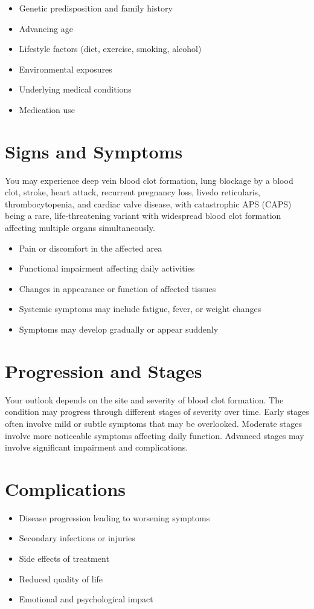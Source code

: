 \begin{itemize}[noitemsep]
  \item Genetic predisposition and family history
  \item Advancing age
  \item Lifestyle factors (diet, exercise, smoking, alcohol)
  \item Environmental exposures
  \item Underlying medical conditions
  \item Medication use
\end{itemize}
\section{Signs and Symptoms}
You may experience deep vein blood clot formation, lung blockage by a blood clot, stroke, heart attack, recurrent pregnancy loss, livedo reticularis, thrombocytopenia, and cardiac valve disease, with catastrophic APS (CAPS) being a rare, life-threatening variant with widespread blood clot formation affecting multiple organs simultaneously.

\begin{itemize}[noitemsep]
  \item Pain or discomfort in the affected area
  \item Functional impairment affecting daily activities
  \item Changes in appearance or function of affected tissues
  \item Systemic symptoms may include fatigue, fever, or weight changes
  \item Symptoms may develop gradually or appear suddenly
\end{itemize}
\section{Progression and Stages}
Your outlook depends on the site and severity of blood clot formation. The condition may progress through different stages of severity over time. Early stages often involve mild or subtle symptoms that may be overlooked. Moderate stages involve more noticeable symptoms affecting daily function. Advanced stages may involve significant impairment and complications.
\section{Complications}
\begin{itemize}[noitemsep]
  \item Disease progression leading to worsening symptoms
  \item Secondary infections or injuries
  \item Side effects of treatment
  \item Reduced quality of life
  \item Emotional and psychological impact
\end{itemize}
